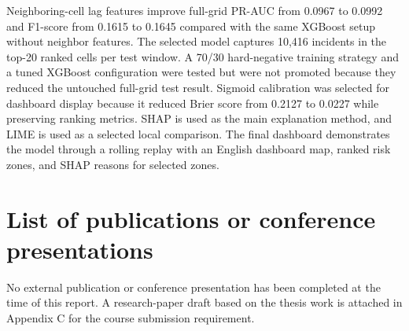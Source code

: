 \documentclass[12pt,a4paper]{report}
\begin{document}
Neighboring-cell lag features improve full-grid PR-AUC from 0.0967 to 0.0992 and F1-score from 0.1615 to 0.1645 compared with the same XGBoost setup without neighbor features. The selected model captures 10,416 incidents in the top-20 ranked cells per test window. A 70/30 hard-negative training strategy and a tuned XGBoost configuration were tested but were not promoted because they reduced the untouched full-grid test result. Sigmoid calibration was selected for dashboard display because it reduced Brier score from 0.2127 to 0.0227 while preserving ranking metrics. SHAP is used as the main explanation method, and LIME is used as a selected local comparison. The final dashboard demonstrates the model through a rolling replay with an English dashboard map, ranked risk zones, and SHAP reasons for selected zones.

\tableofcontents
\listoffigures
\listoftables
\newpage










\appendix







\chapter*{List of publications or conference presentations}
No external publication or conference presentation has been completed at the time of this report. A research-paper draft based on the thesis work is attached in Appendix C for the course submission requirement.
\end{document}
